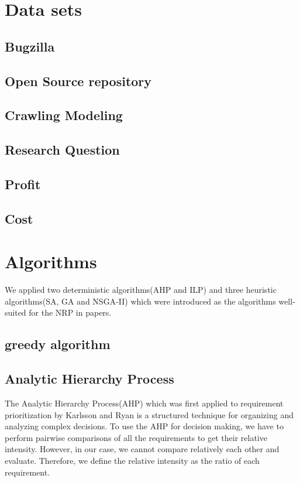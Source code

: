 \section{Data sets}

\subsection{Bugzilla}
\subsection{Open Source repository}
\subsection{Crawling Modeling}
\subsection{Research Question}
\subsection{Profit}
\subsection{Cost}

\section{Algorithms}
We applied two deterministic algorithms(AHP and ILP) and three heuristic algorithms(SA, GA and NSGA-II) which were introduced as the algorithms well-suited for the NRP in papers.\cite{NRP}\cite{ILP}\cite{IGA}\cite{MONRP}

\subsection{greedy algorithm}


\subsection{Analytic Hierarchy Process}
The Analytic Hierarchy Process(AHP) which was first applied to requirement prioritization by Karlsson and Ryan\cite{AHP} is a structured technique for organizing and analyzing complex decisions. To use the AHP for decision making, we have to perform pairwise comparisons of all the requirements to get their relative intensity. However, in our case, we cannot compare relatively each other and evaluate. Therefore, we define the relative intensity as the ratio of each requirement. 


